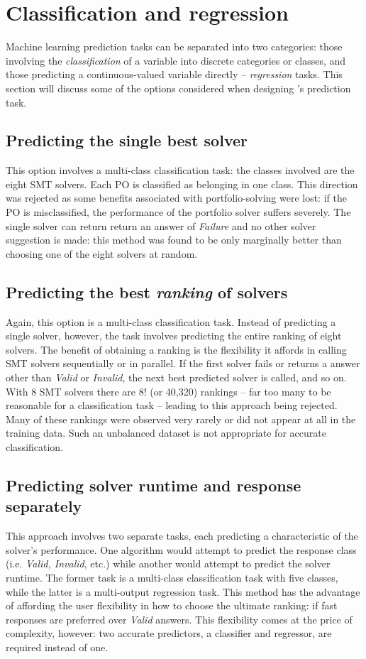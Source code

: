 \section{Classification and regression}
\label{sec:reg-class}

Machine learning prediction tasks can be separated into two categories: those involving the \textit{classification} of a variable into discrete categories or classes, and those predicting a continuous-valued variable directly -- \textit{regression} tasks.
This section will discuss some of the options considered when designing \where's prediction task.

\subsection{Predicting the single best solver} This option involves a multi-class classification task: the classes involved are the eight SMT solvers.
Each PO is classified as belonging in one class. 
This direction was rejected as some benefits associated with portfolio-solving were lost: if the PO is misclassified, the performance of the portfolio solver suffers severely.
The single solver can return return an answer of \textit{Failure} and no other solver suggestion is made: this method was found to be only marginally better than choosing one of the eight solvers at random. 
\subsection{Predicting the best \textit{ranking} of solvers} Again, this option is a multi-class classification task. 
Instead of predicting a single solver, however, the task involves predicting the entire ranking of eight solvers. 
The benefit of obtaining a ranking is the flexibility it affords in calling SMT solvers sequentially or in parallel.
If the first solver fails or returns a answer other than \textit{Valid} or \textit{Invalid}, the next best predicted solver is called, and so on.
With 8 SMT solvers there are 8! (or 40,320) rankings -- far too many to be reasonable for a classification task -- leading to this approach being rejected.
Many of these rankings were observed very rarely or did not appear at all in the training data. 
Such an unbalanced dataset is not appropriate for accurate classification.
\subsection{Predicting solver runtime and response separately}
This approach involves two separate tasks, each predicting a characteristic of the solver's performance. 
One algorithm would attempt to predict the response class (i.e. \textit{Valid, Invalid}, etc.) while another would attempt to predict the solver runtime.
The former task is a multi-class classification task with five classes, while the latter is a multi-output regression task.
This method has the advantage of affording the user flexibility in how to choose the ultimate ranking: if fast responses are preferred over \textit{Valid} answers.
This flexibility comes at the price of complexity, however: two accurate predictors, a classifier and regressor, are required instead of one.
